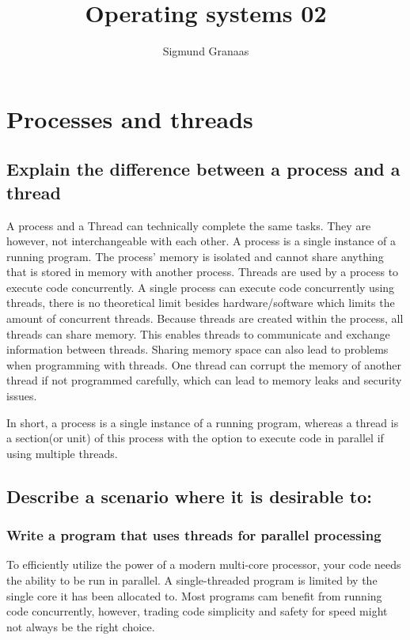 \documentclass[a4paper]{article}
\title{Operating systems 02}
\author{Sigmund Granaas}
\begin{document}
\maketitle


\section{Processes and threads}
\subsection{Explain the difference between a process and a thread}

A process and a Thread can technically complete the same tasks. They are however, not interchangeable with each other. A process is a single instance of a running program. The process' memory is isolated and cannot share anything that is stored in memory with another process. Threads are used by a process to execute code concurrently. A single process can execute code concurrently using threads, there is no theoretical limit besides hardware/software which limits the amount of concurrent threads. Because threads are created within the process, all threads can share memory. This enables threads to communicate and exchange information between threads. Sharing memory space can also lead to problems when programming with threads. One thread can corrupt the memory of another thread if not programmed carefully, which can lead to memory leaks and security issues. 

In short, a process is a single instance of a running program, whereas a thread is a section(or unit) of this process with the option to execute code in parallel if using multiple threads. 

\subsection{Describe a scenario where it is desirable to:}
\subsubsection{Write a program that uses threads for parallel processing}

To efficiently utilize the power of a modern multi-core processor, your code needs the ability to be run in parallel. A single-threaded program is limited by the single core it has been allocated to. Most programs cam benefit from running code concurrently, however, trading code simplicity and safety for speed might not always be the right choice. 
\end{document}
